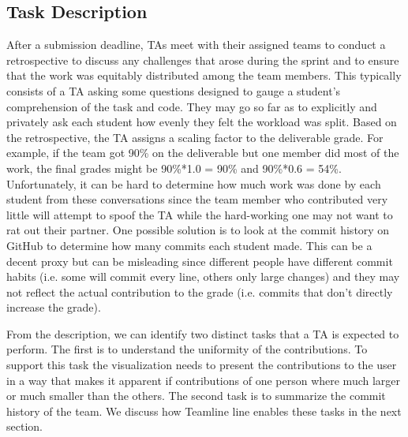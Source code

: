\documentclass[../manifest.tex]{subfiles}
\begin{document}
\subsection{Task Description}
After a submission deadline, TAs meet with their assigned
teams to conduct a retrospective to discuss any challenges that arose
during the sprint and to ensure that the work was equitably distributed among the
team members. This typically consists of a TA asking some questions designed to
gauge a student's comprehension of the task and code. They may go so far as to
explicitly and privately ask each student how evenly they felt the workload was
split. Based on the retrospective, the TA assigns a scaling factor to the deliverable grade. For example, if
the team got 90\% on the deliverable but one member did most of the work, the final
grades might be 90\%*1.0 = 90\% and 90\%*0.6 = 54\%. Unfortunately, it can be hard
to determine how much work was done by each student from these conversations since
the team member who contributed very little will attempt to spoof the TA while the
hard-working one may not want to rat out their partner. One possible solution is
to look at the commit history on GitHub to determine how many commits each student
made. This can be a decent proxy but can be misleading since different people have
different commit habits (i.e. some will commit every line, others only large changes)
and they may not reflect the actual contribution to the grade (i.e. commits that
don't directly increase the grade).

From the description, we can identify two distinct tasks that a TA is expected to perform. The first is to understand the uniformity of the contributions. To support this task the visualization needs to present the contributions to the user in a way that makes it apparent if contributions of one person where much larger or much smaller than the others. The second task is to summarize the commit history of the team. We discuss how Teamline line enables these tasks in the next section.
\end{document}

